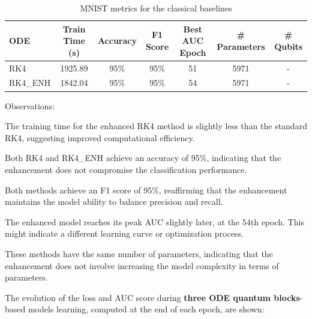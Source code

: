 \documentclass[12pt,a4paper]{report}
\begin{document}
\begin{table}[th]\small\linespread{1}
  \label{tab:classical_MNIST_2}
  \centering
  \begin{tabular}{|l|c|c|c|c|c|c|}
    \hline
    \textbf{ODE} & \textbf{Train Time (s)} & \textbf{Accuracy} & \textbf{F1 Score} & \textbf{Best AUC Epoch} & \textbf{\# Parameters} & \textbf{\# Qubits} \\
    \hline
    RK4          & 1925.89                 & 95\%              & 95\%              & 51                      & 5971                   & -                  \\
    RK4\_ENH     & 1842.04                 & 95\%              & 95\%              & 54                      & 5971                   & -                  \\
    \hline
  \end{tabular}
  \caption{MNIST metrics for the classical baselines}
\end{table}

Observations:

The training time for the enhanced RK4 method is slightly less than the standard RK4, suggesting improved computational efficiency.

Both RK4 and RK4\_ENH achieve an accuracy of 95\%, indicating that the enhancement does not compromise the classification performance.

Both methods achieve an F1 score of 95\%, reaffirming that the enhancement maintains the model ability to balance precision and recall.

The enhanced model reaches its peak AUC slightly later, at the 54th epoch. This might indicate a different learning curve or optimization process.

These methods have the same number of parameters, indicating that the enhancement does not involve increasing the model complexity in terms of parameters.

\clearpage
The evolution of the loss and AUC score during \textbf{three ODE quantum blocks}-based models learning, computed at the end of each epoch, are shown:
\end{document}
